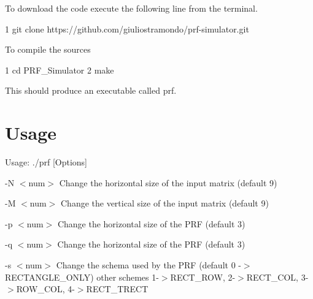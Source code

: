 To download the code execute the following line from the terminal.


\begin{DoxyCode}
1 git clone https://github.com/giuliostramondo/prf-simulator.git
\end{DoxyCode}


To compile the sources 
\begin{DoxyCode}
1 cd PRF\_Simulator
2 make
\end{DoxyCode}


This should produce an executable called prf.

\section*{Usage }

Usage\+: ./prf \mbox{[}Options\mbox{]}

-\/\+N $<$num$>$ Change the horizontal size of the input matrix (default 9)

-\/\+M $<$num$>$ Change the vertical size of the input matrix (default 9)

-\/p $<$num$>$ Change the horizontal size of the P\+R\+F (default 3)

-\/q $<$num$>$ Change the horizontal size of the P\+R\+F (default 3)

-\/s $<$num$>$ Change the schema used by the P\+R\+F (default 0 -\/$>$ R\+E\+C\+T\+A\+N\+G\+L\+E\+\_\+\+O\+N\+L\+Y) other schemes 1-\/$>$R\+E\+C\+T\+\_\+\+R\+O\+W, 2-\/$>$R\+E\+C\+T\+\_\+\+C\+O\+L, 3-\/$>$R\+O\+W\+\_\+\+C\+O\+L, 4-\/$>$R\+E\+C\+T\+\_\+\+T\+R\+E\+C\+T 